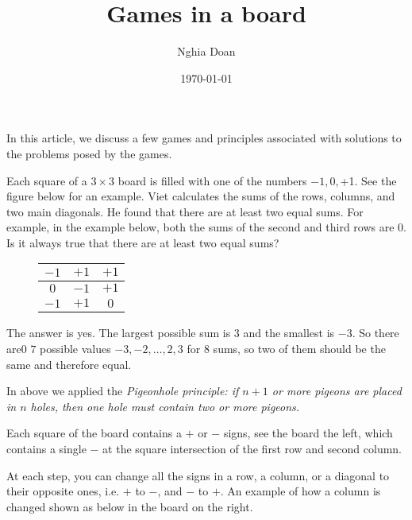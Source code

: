 \documentclass{article}
\title{Games in a board}
\author{Nghia Doan}
\date{\today}
\begin{document}
\maketitle

In this article, we discuss a few games and principles associated with solutions to the problems posed by the games.

\begin{example*}

    Each square of a $3 \times 3$ board is filled with one of the numbers $-1, 0, $+1$.$ See the figure below for an example.
    Viet calculates the sums of the rows, columns, and two main diagonals. He found that there are at least two equal sums.
    For example, in the example below, both the sums of the second and third rows are 0.
    Is it always true that there are at least two equal sums?
\end{example*}

\begin{figure}[h]
    \centering
    \begin{tabular}{|c|c|c|}
        \hline
        $-1$ & $$+1$$ & $$+1$$ \\ \hline
        $0$  & $-1$ & $$+1$$ \\ \hline
        $-1$ & $$+1$$ & $0$  \\ \hline
    \end{tabular}
\end{figure}

\begin{soln}
    The answer is yes. The largest possible sum is $3$ and the smallest is $-3.$
    So there are0 $7$ possible values $-3,-2,\ldots,2,3$ for $8$ sums, so two of them should be the same and therefore equal.

    In above we applied the \textit{Pigeonhole principle: if $n+1$ or more pigeons are placed in $n$ holes,
    then one hole must contain two or more pigeons.} 
\end{soln}

\begin{example*}

    Each square of the  board contains a $+$ or $-$ signs, see the board the left,
    which contains a single $-$ at the square intersection of the first row and second column.

    At each step, you can change all the signs in a row, a column, or a diagonal to their opposite ones, i.e. $+$ to $-$, and $-$  to $+$.
    An example of how a column is changed shown as below in the board on the right.
\end{example*}
\end{document}
